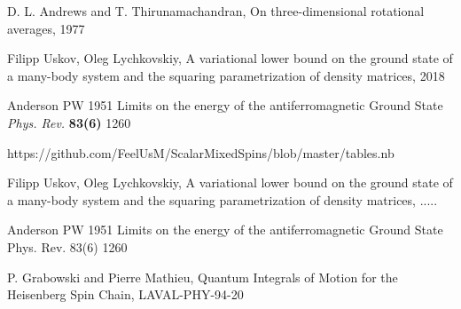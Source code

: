 \documentclass[]{article}
\begin{document}
\begin{thebibliography}{3}
	D. L. Andrews and T. Thirunamachandran, On three-dimensional rotational averages, 1977
	
	Filipp Uskov, Oleg Lychkovskiy, A variational lower bound on the ground state of a 	many-body system and the squaring parametrization of density matrices, 2018
	
	 Anderson PW 1951
	Limits on the energy of the antiferromagnetic Ground State
	{\it Phys. Rev.} {\bf 83(6)} 1260
	
	https://github.com/FeelUsM/ScalarMixedSpins/blob/master/tables.nb
	
	Filipp Uskov, Oleg Lychkovskiy, A variational lower bound on the ground state of a many-body system and the squaring parametrization of density matrices, .....
	
	Anderson PW 1951 Limits on the energy of the antiferromagnetic Ground State Phys. Rev. 83(6) 1260
	
	P. Grabowski and Pierre Mathieu, Quantum Integrals of Motion for the Heisenberg Spin Chain, LAVAL-PHY-94-20
	
\end{thebibliography}
\end{document}
